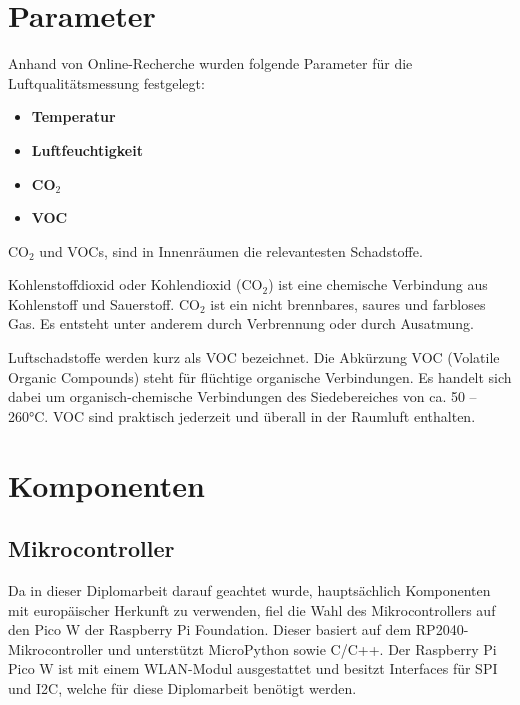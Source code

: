 \begin{inhalt}
\renewcommand*\chapterpagestyle{scrheadings}

\section{Parameter}

Anhand von Online-Recherche \cite{Luftparameter1, Luftparameter2} wurden folgende Parameter für die Luftqualitätsmessung festgelegt:

\begin{itemize}
    \item \textbf{Temperatur}
    \item \textbf{Luftfeuchtigkeit}
    \item \textbf{CO$_2$}
    \item \textbf{VOC}
\end{itemize}

CO$_2$ und VOCs, sind in Innenräumen die relevantesten Schadstoffe. 

\smallskip

Kohlenstoffdioxid oder Kohlendioxid (CO$_2$) ist eine chemische Verbindung aus Kohlenstoff und Sauerstoff. CO$_2$ ist ein nicht brennbares, saures und farbloses Gas. Es entsteht unter anderem durch Verbrennung oder durch Ausatmung. \cite{CO2Wiki}

\smallskip

Luftschadstoffe werden kurz als VOC bezeichnet. Die Abkürzung VOC (Volatile Organic Compounds) steht für flüchtige organische Verbindungen. Es handelt sich dabei um organisch-chemische Verbindungen des Siedebereiches von ca. 50 – 260°C. VOC sind praktisch jederzeit und überall in der Raumluft enthalten. \cite{Luftparameter1}


\section{Komponenten}

\subsection{Mikrocontroller}

Da in dieser Diplomarbeit darauf geachtet wurde, hauptsächlich Komponenten mit europäischer Herkunft zu verwenden, fiel die Wahl des Mikrocontrollers auf den Pico W der Raspberry Pi Foundation. Dieser basiert auf dem RP2040-Mikrocontroller und unterstützt MicroPython sowie C/C++. Der Raspberry Pi Pico W ist mit einem WLAN-Modul ausgestattet und besitzt Interfaces für SPI und I2C, welche für diese Diplomarbeit benötigt werden. \cite{Raspberry_Pi_Pico_W}


\end{inhalt}
